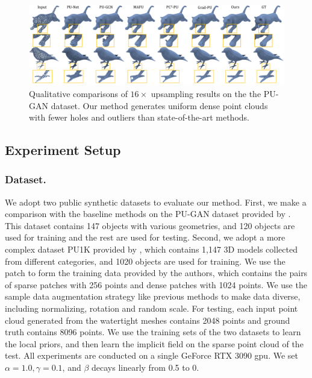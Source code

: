 \documentclass[letterpaper]{article} %
\begin{document}
\begin{figure}
\centering
\includegraphics[width=1.0\linewidth]{pugan_compare.pdf}
\caption{Qualitative comparisons of $16\times$ upsampling results on the the PU-GAN dataset. Our method generates uniform dense point clouds with fewer holes and outliers than state-of-the-art methods.}
\label{fig:pugan_compare}
\end{figure}
\subsection{Experiment Setup}
\subsubsection{Dataset.}
We adopt two public synthetic datasets to evaluate our method. First, we make a comparison with the baseline methods on the PU-GAN dataset provided by \cite{li2019pu}. This dataset contains 147 objects with various geometries, and 120 objects are used for training and the rest are used for testing. Second, we adopt a more complex dataset PU1K provided by \cite{qian2021pu}, which contains 1,147 3D models collected from different categories, and 1020 objects are used for training. We use the patch to form the training data provided by the authors, which contains the pairs of sparse patches with 256 points and dense patches with 1024 points. We use the sample data augmentation strategy like previous methods \cite{he2023grad} to make data diverse, including normalizing, rotation and random scale. For testing, each input point cloud generated from the watertight meshes contains 2048 points and ground truth contains 8096 points. We use the training sets of the two datasets to learn the local priors, and then learn the implicit field on the sparse point cloud of the test. All experiments are conducted on a single GeForce RTX 3090 gpu. We set $\alpha=1.0, \gamma=0.1$, and $\beta$ decays linearly from 0.5 to 0.
\end{document}
